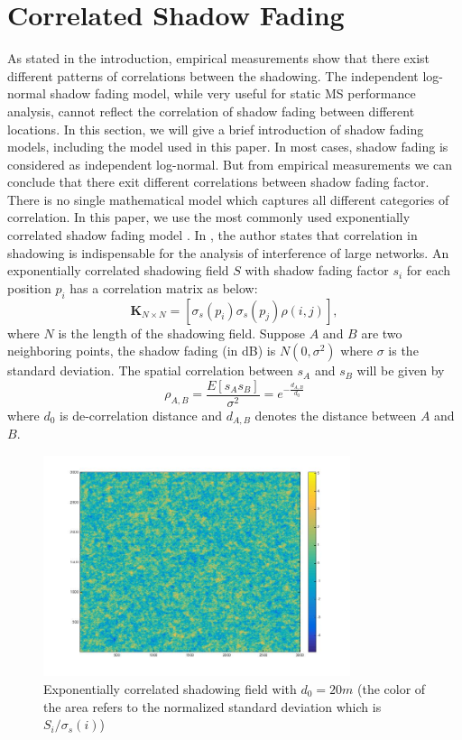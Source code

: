 \documentclass[journal,comsoc]{IEEEtran}
\begin{document}
\section{Correlated Shadow Fading}
\label{CorrShadowField}
As stated in the introduction, empirical measurements show that there exist different patterns of correlations between the shadowing. The independent log-normal shadow fading model, while very useful for static MS performance analysis, cannot reflect the correlation of shadow fading between different locations. In this section, we will give a brief introduction of shadow fading models, including the model used in this paper.
In most cases, shadow fading is considered as independent log-normal. But from empirical measurements we can conclude that there exit different correlations between shadow fading factor. There is no single mathematical model which captures all different categories of correlation\cite{szyszkowicz2010feasibility}. In this paper, we use the most commonly used exponentially correlated shadow fading model \cite{szyszkowicz2011interference}. In \cite{szyszkowicz2011interference}, the author states that correlation in shadowing is indispensable for the analysis of interference of large networks. An exponentially correlated shadowing field $S$ with shadow fading factor $s_{i}$ for each position $p_{i}$ has a correlation matrix as below:
\begin{equation}
\mathbf{K}_{N\times N} = [ \sigma_{s}(p_{i})\sigma_{s}(p_{j})\rho(i,j)],
\label{correlationmatrix}
\end{equation}
where $N$ is the length of the shadowing field. Suppose $A$ and $B$ are two neighboring points, the shadow fading (in dB) is $N(0,\sigma^2)$ where $\sigma$ is the standard deviation. The spatial correlation between $s_{A}$ and $s_{B}$ will be given by 
\begin{equation}
\rho_{A,B} = \frac{E[s_{A}s_{B}]}{\sigma^2} =e^{-\frac{d_{A,B}}{d_{0}}}
\end{equation}
where $d_{0}$ is de-correlation distance and  $d_{A, B}$ denotes the distance between $A$ and $B$.
\begin{figure}
\centering
\includegraphics[width = 9cm]{ShadowFieldDeCorr20.jpg}
\caption{Exponentially correlated shadowing field with $d_{0} = 20m$ (the color of the area refers to the normalized standard deviation  which is $S_{i}/\sigma_{s}(i)$)}

\label{shadowingfield}
\end{figure}
\end{document}
